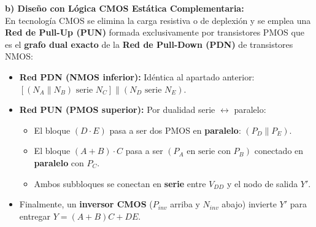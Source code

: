 \begin{ejercicio}
\vspace{4pt}
\textbf{b) Diseño con Lógica CMOS Estática Complementaria:}\\[4pt]
En tecnología CMOS se elimina la carga resistiva o de deplexión y se emplea una \textbf{Red de Pull-Up (PUN)} formada exclusivamente por transistores PMOS que es el \textbf{grafo dual exacto} de la \textbf{Red de Pull-Down (PDN)} de transistores NMOS:
\begin{itemize}[leftmargin=*]
    \item \textbf{Red PDN (NMOS inferior):} Idéntica al apartado anterior: $\left[(N_A \parallel N_B) \text{ serie } N_C\right] \parallel (N_D \text{ serie } N_E)$.
    \item \textbf{Red PUN (PMOS superior):} Por dualidad serie $\leftrightarrow$ paralelo:
    \begin{itemize}
        \item El bloque $(D \cdot E)$ pasa a ser dos PMOS en \textbf{paralelo}: $(P_D \parallel P_E)$.
        \item El bloque $(A + B) \cdot C$ pasa a ser $(P_A \text{ en serie con } P_B)$ conectado en \textbf{paralelo} con $P_C$.
        \item Ambos subbloques se conectan en \textbf{serie} entre $V_{DD}$ y el nodo de salida $Y'$.
    \end{itemize}
    \item Finalmente, un \textbf{inversor CMOS} ($P_{inv}$ arriba y $N_{inv}$ abajo) invierte $Y'$ para entregar $Y = (A+B)C + DE$.
\end{itemize}

\begin{center}
\end{center}
\end{ejercicio}
